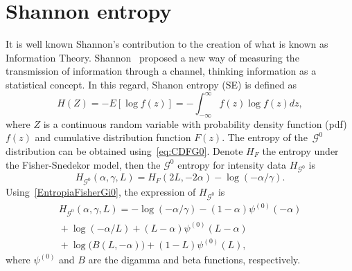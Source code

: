 \documentclass[journal]{IEEEtran}
\begin{document}
\section{Shannon entropy}

It is well known Shannon's contribution to the creation of what is known as Information Theory. 
Shannon~\cite{Shannon1948} proposed a new way of
measuring the transmission of information through a channel, thinking information as a statistical concept. 
In this regard, Shanon entropy (SE) is defined as
\begin{equation}
	H(Z)=-E[\log f(z)]=-\int_{-\infty}^{\infty} f(z) \log f(z) d z,
	\label{SE}
\end{equation}
where $Z$ is a continuous random variable with probability density function (pdf) $f(z)$ and
cumulative distribution function $F(z)$. 
The entropy of the~$\mathcal{G}^0$ distribution can be obtained using~\eqref{eq:CDFG0}.
Denote $H_{F}$ the entropy under the Fisher-Snedekor model, then the $\mathcal{G}^0$ entropy for intensity data $H_{\mathcal G^0}$ is 
\begin{equation}
	\label{EntropiaFisherGi0}
	H_{\mathcal G^0}(\alpha,\gamma,L)=H_{F}(2 L, - 2 \alpha) -\log(-\alpha / \gamma).
\end{equation}
Using~\eqref{EntropiaFisherGi0}, the
expression of $H_{\mathcal G^0}$ is
\begin{multline}
	\label{EG0}
	H_{\mathcal G^0}(\alpha,\gamma,L)=-\log (-\alpha / \gamma)-(1-\alpha ) \psi^{(0)}(-\alpha )\\ 
	\mbox{}+\log (-\alpha / L)+ ( L- \alpha ) \psi ^{(0)} ( L- \alpha )\\ 
	\mbox{}+\log \big(B(L,-\alpha )\big)+(1-L) \psi^{(0)}(L),
\end{multline}
where $\psi^{(0)}$ and $B$ are the digamma and beta functions, respectively.


\end{document}
